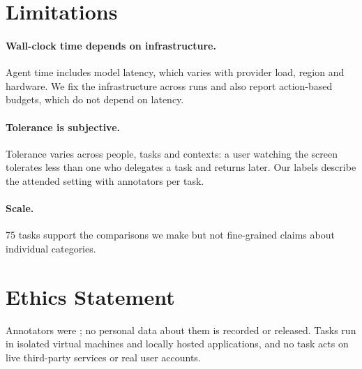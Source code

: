 \section*{Limitations}
\label{sec:limitations}

\paragraph{Wall-clock time depends on infrastructure.} Agent time includes model latency, which varies with provider load, region and hardware. We fix the infrastructure across runs and also report action-based budgets, which do not depend on latency. 

\paragraph{Tolerance is subjective.} Tolerance varies across people, tasks and contexts: a user watching the screen tolerates less than one who delegates a task and returns later. Our labels describe the attended setting with  annotators per task.

\paragraph{Scale.} 75 tasks support the comparisons we make but not fine-grained claims about individual categories. 

\section*{Ethics Statement}
Annotators were ; no personal data about them is recorded or released. Tasks run in isolated virtual machines and locally hosted applications, and no task acts on live third-party services or real user accounts.
